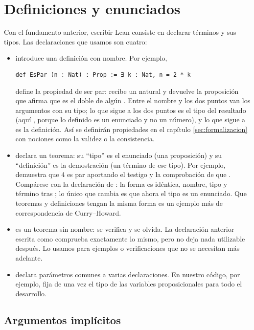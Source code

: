 \section{Definiciones y enunciados}\label{sec:escribir-lean}

Con el fundamento anterior, escribir Lean consiste en declarar términos y sus tipos. Las declaraciones que usamos son cuatro:

\begin{itemize}
  \item {} introduce una definición con nombre. Por ejemplo,
\begin{lstlisting}
def EsPar (n : Nat) : Prop := ∃ k : Nat, n = 2 * k
\end{lstlisting}
        define la propiedad de ser par: recibe un natural  y devuelve la proposición que afirma que  es el doble de algún . Entre el nombre y los dos puntos van los argumentos con su tipo; lo que sigue a los dos puntos es el tipo del resultado (aquí , porque lo definido es un enunciado y no un número), y lo que sigue a \lean{:=} es la definición. Así se definirán propiedades en el capítulo \ref{sec:formalizacion} con nociones como la validez o la consistencia.
  \item {} declara un teorema: su ``tipo'' es el enunciado (una proposición) y su ``definición'' es la demostración (un término de ese tipo). Por ejemplo,  demuestra que 4 es par aportando el testigo  y la comprobación de que . Compárese con la declaración de : la forma es idéntica, nombre, tipo y término tras \lean{:=}; lo único que cambia es que ahora el tipo es un enunciado. Que teoremas y definiciones tengan la misma forma es un ejemplo más de correspondencia de Curry--Howard.
  \item {} es un teorema sin nombre: se verifica y se olvida. La declaración anterior escrita como  comprueba exactamente lo mismo, pero no deja nada utilizable después. Lo usamos para ejemplos o verificaciones que no se necesitan más adelante.
  \item {} declara parámetros comunes a varias declaraciones. En nuestro código, por ejemplo,  fija de una vez el tipo de las variables proposicionales para todo el desarrollo.
\end{itemize}

\subsection*{Argumentos implícitos}

